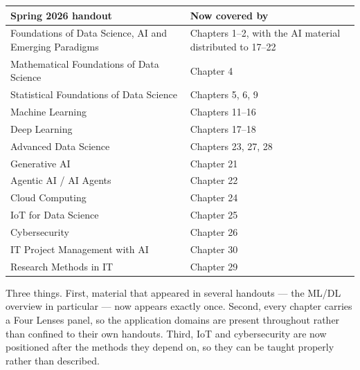 \begin{longtable}{@{}L{6.4cm}L{7.6cm}@{}}
\toprule
{}
\textbf{Spring 2026 handout} & \textbf{Now covered by} \\
\midrule
\endhead
Foundations of Data Science, AI and Emerging Paradigms & Chapters 1--2, with the AI material distributed to 17--22 \\
Mathematical Foundations of Data Science & Chapter 4 \\
Statistical Foundations of Data Science & Chapters 5, 6, 9 \\
Machine Learning & Chapters 11--16 \\
Deep Learning & Chapters 17--18 \\
Advanced Data Science & Chapters 23, 27, 28 \\
Generative AI & Chapter 21 \\
Agentic AI / AI Agents & Chapter 22 \\
Cloud Computing & Chapter 24 \\
IoT for Data Science & Chapter 25 \\
Cybersecurity & Chapter 26 \\
IT Project Management with AI & Chapter 30 \\
Research Methods in IT & Chapter 29 \\
\bottomrule
\end{longtable}

\begin{conceptbox}
Three things. First, material that appeared in several handouts --- the ML/DL
overview in particular --- now appears exactly once. Second, every chapter carries a
Four Lenses panel, so the application domains are present throughout rather than
confined to their own handouts. Third, IoT and cybersecurity are now positioned
after the methods they depend on, so they can be taught properly rather than
described.
\end{conceptbox}
